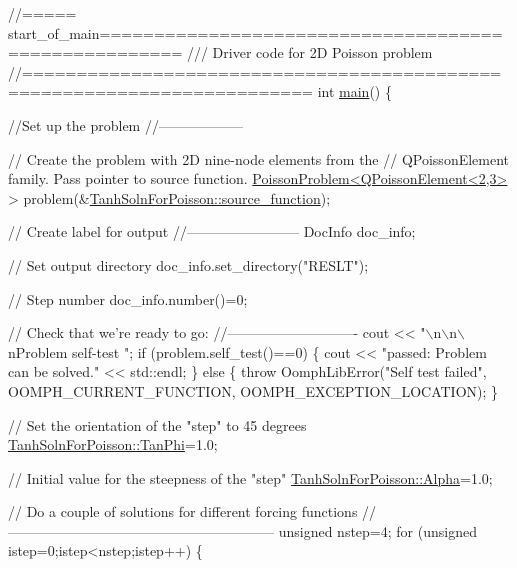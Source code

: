  
\begin{DoxyCodeInclude}
\textcolor{comment}{//===== start\_of\_main=====================================================}
\textcolor{comment}{/// Driver code for 2D Poisson problem}
\textcolor{comment}{}\textcolor{comment}{//========================================================================}
\textcolor{keywordtype}{int} \hyperlink{two__d__poisson_8cc_ae66f6b31b5ad750f1fe042a706a4e3d4}{main}()
\{

 \textcolor{comment}{//Set up the problem}
 \textcolor{comment}{//------------------}

 \textcolor{comment}{// Create the problem with 2D nine-node elements from the}
 \textcolor{comment}{// QPoissonElement family. Pass pointer to source function. }
 \hyperlink{classPoissonProblem}{PoissonProblem<QPoissonElement<2,3>} > 
  problem(&\hyperlink{namespaceTanhSolnForPoisson_a967bc28320e02534beb714846b63e251}{TanhSolnForPoisson::source\_function});

 \textcolor{comment}{// Create label for output}
 \textcolor{comment}{//------------------------}
 DocInfo doc\_info;

 \textcolor{comment}{// Set output directory}
 doc\_info.set\_directory(\textcolor{stringliteral}{"RESLT"});

 \textcolor{comment}{// Step number}
 doc\_info.number()=0;

 \textcolor{comment}{// Check that we're ready to go:}
 \textcolor{comment}{//----------------------------}
 cout << \textcolor{stringliteral}{"\(\backslash\)n\(\backslash\)n\(\backslash\)nProblem self-test "};
 \textcolor{keywordflow}{if} (problem.self\_test()==0) 
  \{
   cout << \textcolor{stringliteral}{"passed: Problem can be solved."} << std::endl;
  \}
 \textcolor{keywordflow}{else} 
  \{
   \textcolor{keywordflow}{throw} OomphLibError(\textcolor{stringliteral}{"Self test failed"},
                       OOMPH\_CURRENT\_FUNCTION,
                       OOMPH\_EXCEPTION\_LOCATION);
  \}

 
 \textcolor{comment}{// Set the orientation of the "step" to 45 degrees}
 \hyperlink{namespaceTanhSolnForPoisson_a785ccd00a727125a5138fbbcac173294}{TanhSolnForPoisson::TanPhi}=1.0;
 
 \textcolor{comment}{// Initial value for the steepness of the "step"}
 \hyperlink{namespaceTanhSolnForPoisson_ae676ccd186d5df119cce811596d949c1}{TanhSolnForPoisson::Alpha}=1.0; 


 \textcolor{comment}{// Do a couple of solutions for different forcing functions}
 \textcolor{comment}{//---------------------------------------------------------}
 \textcolor{keywordtype}{unsigned} nstep=4;
 \textcolor{keywordflow}{for} (\textcolor{keywordtype}{unsigned} istep=0;istep<nstep;istep++)
  \{


\end{DoxyCodeInclude}
